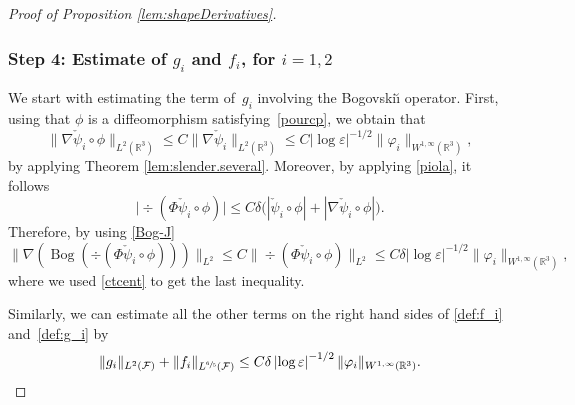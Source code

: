 \documentclass[11pt]{article}
\providecommand{\widecheck}{\check}
\newcommand{\R}{\mathbb{R}}
\let\eps\varepsilon
\DeclareMathOperator{\Bog}{Bog}
\theoremstyle{definition}
\theoremstyle{remark}
\begin{document}
\begin{proof}[Proof of Proposition \ref{lem:shapeDerivatives}]
\subsubsection*{Step 4: Estimate of $g_i$ and $f_i$, for $i=1,2$}
We start with estimating the term of~$g_i$ involving the Bogovski\u{\i} operator.
First, using that
$\phi$ is a diffeomorphism satisfying~\eqref{pourcp},
we obtain that
\begin{equation} \label{ctcent}
\|\nabla \widecheck \psi_i \circ \phi\|_{L^2(\R^3)} \leq C \|\nabla \widecheck \psi_i\|_{L^2(\R^3)} \leq C \left|\log \eps\right|^{-1/2} \|\varphi_i\|_{W^{1,\infty}(\R^3)},
\end{equation}
by applying Theorem \ref{lem:slender.several}.
Moreover, by applying \eqref{piola}, it follows
\begin{equation} \label{giro}
\bigl|\div (\Phi \widecheck \psi_i \circ \phi)\bigr|
\leq C {\delta} \bigl(|\widecheck \psi_i \circ \phi|
+ |\nabla \widecheck \psi_i \circ \phi|\bigr).
\end{equation}
Therefore, by using \eqref{Bog-J}
\begin{equation*}
\|\nabla(\Bog(\div(\Phi \widecheck \psi_i \circ \phi)))\|_{L^2} \leq C
\bigl\|\div(\Phi \widecheck \psi_i \circ \phi)\bigr\|_{L^2}
\leq C \delta \left|\log \eps\right|^{-1/2} \|\varphi_i\|_{W^{1,\infty}(\R^3)},
\end{equation*}
where we used
\eqref{ctcent} to get the last inequality.

Similarly, we can estimate all the other terms on the right hand sides of \eqref{def:f_i} and~\eqref{def:g_i} by
\begin{equation} \label{midi4}
\|g_i\|_{L^2(\mathcal F)} + \|f_i\|_{L^{\sfrac 6 5 }(\mathcal F)} \leq C \delta \left|\log \eps\right|^{-1/2} \| \varphi_i\|_{W^{1,\infty}(\R^3)}.
\end{equation}


\end{proof}
\end{document}
